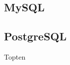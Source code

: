 \subsection{MySQL}
\subsection{PostgreSQL}
\cite{TopTenDatabases}Topten\newline
\cite{indeedDBLanguage}\newline

